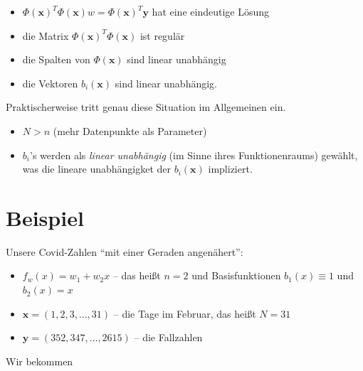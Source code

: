 \documentclass[]{book}
\providecommand{\tightlist}{%
  \setlength{\itemsep}{0pt}\setlength{\parskip}{0pt}}
\theoremstyle{definition}
\theoremstyle{definition}
\theoremstyle{definition}
\theoremstyle{definition}
\theoremstyle{remark}
\begin{document}
\begin{itemize}
\tightlist
\item
  \(\Phi(\mathbf x)^T\Phi(\mathbf x)w = \Phi(\mathbf x)^T\mathbf y\) hat eine eindeutige Lösung
\item
  die Matrix \(\Phi(\mathbf x)^T\Phi(\mathbf x)\) ist regulär
\item
  die Spalten von \(\Phi(\mathbf x)\) sind linear unabhängig
\item
  die Vektoren \(b_i(\mathbf x)\) sind linear unabhängig.
\end{itemize}

Praktischerweise tritt genau diese Situation im Allgemeinen ein.

\begin{itemize}
\tightlist
\item
  \(N>n\) (mehr Datenpunkte als Parameter)
\item
  \(b_i\)'s werden als \emph{linear unabhängig} (im Sinne ihres Funktionenraums) gewählt, was die lineare unabhängigket der \(b_i(\mathbf x)\) impliziert.
\end{itemize}

\hypertarget{beispiel}{%
\section{Beispiel}\label{beispiel}}

Unsere Covid-Zahlen ``mit einer Geraden angenähert'':

\begin{itemize}
\tightlist
\item
  \(f_w(x) = w_1 + w_2 x\) -- das heißt \(n=2\) und Basisfunktionen \(b_1(x)\equiv 1\) und \(b_2(x) = x\)
\item
  \(\mathbf x = (1,2,3, \dots, 31)\) -- die Tage im Februar, das heißt \(N=31\)
\item
  \(\mathbf y = (352, 347, \dots, 2615)\) -- die Fallzahlen
\end{itemize}

Wir bekommen
\end{document}
